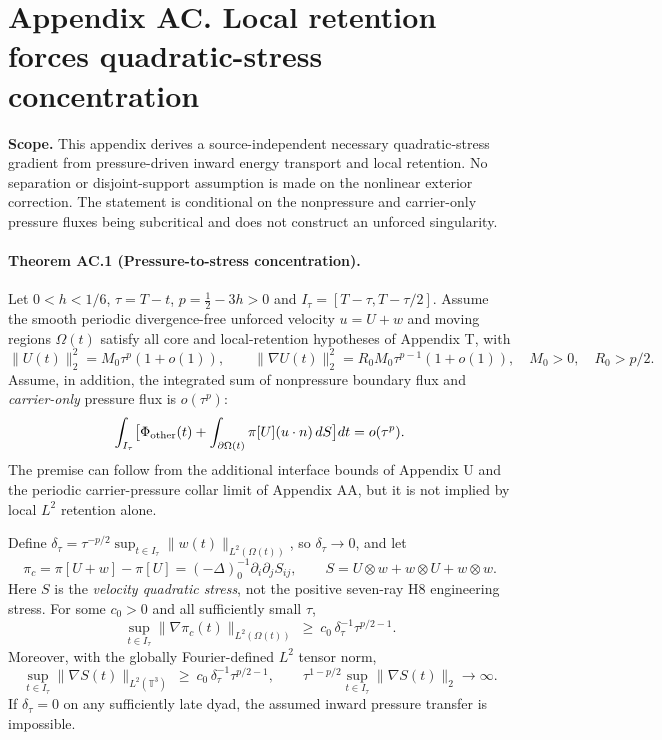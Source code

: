 \clearpage
\section*{Appendix AC. Local retention forces quadratic-stress concentration}
\noindent\textbf{Scope.} This appendix derives a source-independent necessary quadratic-stress gradient from pressure-driven inward energy transport and local retention. No separation or disjoint-support assumption is made on the nonlinear exterior correction. The statement is conditional on the nonpressure and carrier-only pressure fluxes being subcritical and does not construct an unforced singularity.

\paragraph{Theorem AC.1 (Pressure-to-stress concentration).}
Let $0<h<1/6$, $\tau=T-t$, $p=\tfrac12-3h>0$ and
$I_\tau=[T-\tau,T-\tau/2]$. Assume the smooth periodic divergence-free
unforced velocity $u=U+w$ and moving regions $\Omega(t)$ satisfy
all core and local-retention hypotheses of Appendix T, with
\[
 \|U(t)\|_2^2=M_0\tau^p(1+o(1)),\qquad
 \|\nabla U(t)\|_2^2=R_0M_0\tau^{p-1}(1+o(1)),
 \quad M_0>0,\quad R_0>p/2.
\]
Assume, in addition, the integrated sum of nonpressure boundary
flux and \emph{carrier-only} pressure flux is $o(\tau^p)$:
\begin{equation}\label{eq:AC-other}
\int_{I_\tau}\bigl[\Phi_{\rm other}(t)+
\int_{\partial\Omega(t)}\pi[U](u\cdot n)\,dS\bigr]dt
=o(\tau^p).
\end{equation}
The premise can follow from the additional interface bounds of
Appendix U and the periodic carrier-pressure collar limit of Appendix AA,
but it is not implied by local $L^2$ retention alone.

Define $\delta_\tau=\tau^{-p/2}\sup_{t\in I_\tau}
\|w(t)\|_{L^2(\Omega(t))}$, so $\delta_\tau\to0$,
and let
\[
 \pi_c=\pi[U+w]-\pi[U]=(-\Delta)^{-1}_0\partial_i\partial_j S_{ij},
 \qquad S=U\otimes w+w\otimes U+w\otimes w.
\]
Here $S$ is the \emph{velocity quadratic stress}, not the positive
seven-ray H8 engineering stress. For some $c_0>0$ and all sufficiently
small $\tau$,
\begin{equation}\label{eq:AC-L2}
\boxed{
\sup_{t\in I_\tau}\|\nabla\pi_c(t)\|_{L^2(\Omega(t))}
\ \ge\ c_0\,\delta_\tau^{-1}\tau^{p/2-1}.}
\end{equation}
Moreover, with the globally Fourier-defined $L^2$ tensor norm,
\begin{equation}\label{eq:AC-stress}
\boxed{
\sup_{t\in I_\tau}\|\nabla S(t)\|_{L^2(\mathbb T^3)}
\ \ge\ c_0\,\delta_\tau^{-1}\tau^{p/2-1},
\qquad
\tau^{1-p/2}\sup_{t\in I_\tau}\|\nabla S(t)\|_2\longrightarrow\infty.
}
\end{equation}
If $\delta_\tau=0$ on any sufficiently late dyad, the assumed
inward pressure transfer is impossible.

